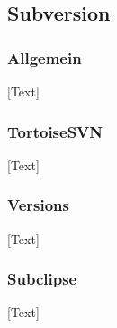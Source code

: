
\subsection{Subversion}

\subsubsection{Allgemein}
[Text]

\subsubsection{TortoiseSVN}
[Text]

\subsubsection{Versions}
[Text]

\subsubsection{Subclipse}
[Text]


